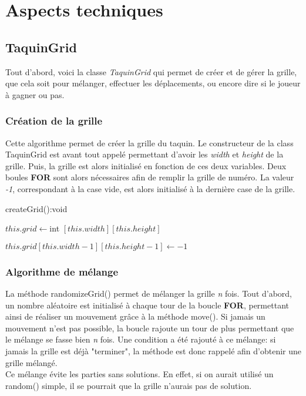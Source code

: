 \chapter{Aspects techniques}

	\section{TaquinGrid}

		Tout d'abord, voici la classe \textit{TaquinGrid} qui permet de créer et de gérer la grille, que cela soit pour mélanger, effectuer les déplacements, ou encore dire si le joueur à gagner ou pas.

		\subsection{Création de la grille}

			Cette algorithme permet de créer la grille du taquin. Le constructeur de la class TaquinGrid est avant tout appelé permettant d'avoir les \textit{width} et \textit{height} de la grille. Puis, la grille est alors initialisé en fonction de ces deux variables. Deux boules \textbf{FOR} sont alors nécessaires afin de remplir la grille de numéro. La valeur \textit{-1}, correspondant à la case vide, est alors initialisé à la dernière case de la grille.\\


			\begin{algorithm}[H]
				\caption{createGrid():void}
				$this.grid \leftarrow $int $[this.width][this.height]$


				$this.grid[this.width-1][this.height-1] \leftarrow -1$
			\end{algorithm}

		\subsection{Algorithme de mélange}

			La méthode randomizeGrid() permet de mélanger la grille \textit{n} fois. Tout d'abord, un nombre aléatoire est initialisé à chaque tour de la boucle \textbf{FOR}, permettant ainsi de réaliser un mouvement grâce à la méthode move(). Si jamais un mouvement n'est pas possible, la boucle rajoute un tour de plus permettant que le mélange se fasse bien \textit{n} fois. Une condition a été rajouté à ce mélange: si jamais la grille est déjà "terminer", la méthode est donc rappelé afin d'obtenir une grille mélangé.\\
			Ce mélange évite les parties sans solutions. En effet, si on aurait utilisé un random() simple, il se pourrait que la grille n'aurais pas de solution.\\

